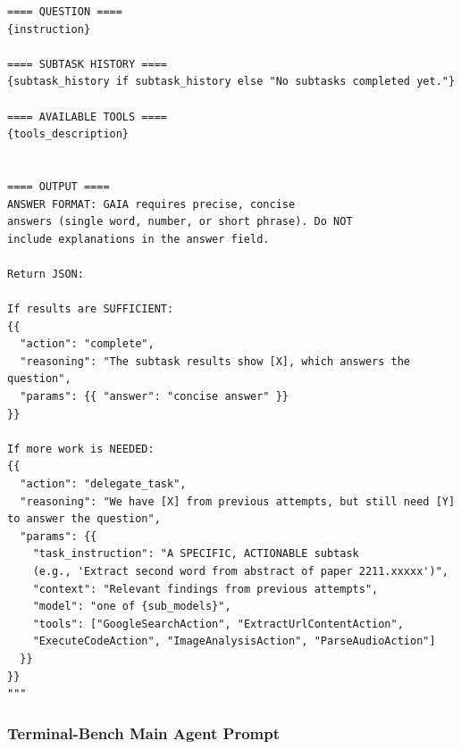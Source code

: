 \begin{tcolorbox}[title={\textbf{\small GAIA Main Agent Prompt }}, boxrule=1pt, arc=0mm, colback=black!5!white, colframe=black!75!white, breakable, before skip=10pt, after skip=10pt, pad at break=2mm, parbox=false]
\begin{verbatim}
==== QUESTION ====
{instruction}

==== SUBTASK HISTORY ====
{subtask_history if subtask_history else "No subtasks completed yet."}

==== AVAILABLE TOOLS ====
{tools_description}


==== OUTPUT ====
ANSWER FORMAT: GAIA requires precise, concise 
answers (single word, number, or short phrase). Do NOT 
include explanations in the answer field.

Return JSON:

If results are SUFFICIENT:
{{
  "action": "complete",
  "reasoning": "The subtask results show [X], which answers the question",
  "params": {{ "answer": "concise answer" }}
}}

If more work is NEEDED:
{{
  "action": "delegate_task", 
  "reasoning": "We have [X] from previous attempts, but still need [Y] to answer the question",
  "params": {{
    "task_instruction": "A SPECIFIC, ACTIONABLE subtask 
    (e.g., 'Extract second word from abstract of paper 2211.xxxxx')",
    "context": "Relevant findings from previous attempts",
    "model": "one of {sub_models}",
    "tools": ["GoogleSearchAction", "ExtractUrlContentAction", 
    "ExecuteCodeAction", "ImageAnalysisAction", "ParseAudioAction"]
  }}
}}
"""
\end{verbatim}
\end{tcolorbox}



\subsubsection{Terminal-Bench Main Agent Prompt}
\label{app:B1_terminal}

